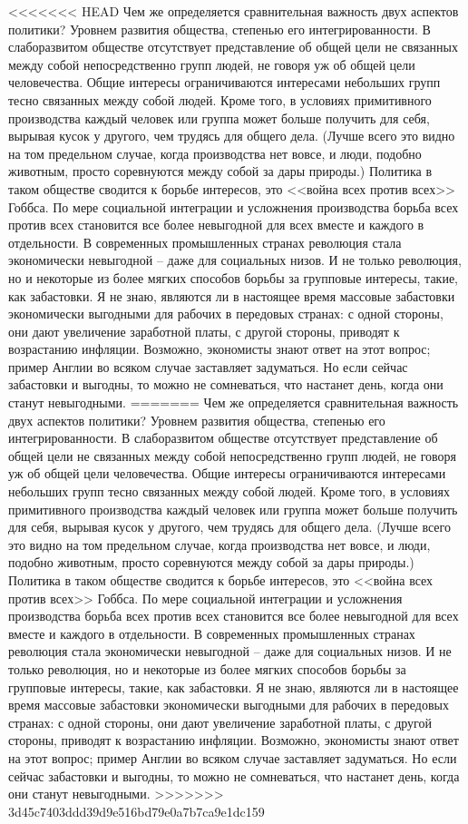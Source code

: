 \documentclass{book}
\begin{document}
<<<<<<< HEAD
Чем же определяется сравнительная важность двух аспектов политики? Уровнем развития общества, степенью его интегрированности. В слаборазвитом обществе отсутствует представ­ление об общей цели не связанных между собой непосредствен­но групп людей, не говоря уж об общей цели человечества. Общие интересы ограничиваются интересами небольших групп тесно связанных между собой людей. Кроме того, в условиях примитивного производства каждый человек или группа может больше получить для себя, вырывая кусок у другого, чем тру­дясь для общего дела. (Лучше всего это видно на том предель­ном случае, когда производства нет вовсе, и люди, подобно животным, просто соревнуются между собой за дары природы.) Политика в таком обществе сводится к борьбе интересов, это <<война всех против всех>> Гоббса. По мере социальной инте­грации и усложнения производства борьба всех против всех становится все более невыгодной для всех вместе и каждого в отдельности. В современных промышленных странах революция стала экономически невыгодной --  даже для со­циальных низов. И не только революция, но и некоторые из более мягких способов борьбы за групповые интересы, такие, как забастовки. Я не знаю, являются ли в настоящее время массовые забастовки экономически выгодными для рабочих в передовых странах: с одной стороны, они дают увеличение заработной платы, с другой стороны, приводят к возрастанию инфляции. Возможно, экономисты знают ответ на этот вопрос; пример Англии во всяком случае заставляет задуматься. Но если сейчас забастовки и выгодны, то можно не сомневаться, что настанет день, когда они станут невыгодными.
=======
Чем же определяется сравнительная важность двух аспектов политики? Уровнем развития общества, степенью его интегрированности. В слаборазвитом обществе отсутствует представ­ление об общей цели не связанных между собой непосредствен­но групп людей, не говоря уж об общей цели человечества. Общие интересы ограничиваются интересами небольших групп тесно связанных между собой людей. Кроме того, в условиях примитивного производства каждый человек или группа может больше получить для себя, вырывая кусок у другого, чем тру­дясь для общего дела. (Лучше всего это видно на том предель­ном случае, когда производства нет вовсе, и люди, подобно животным, просто соревнуются между собой за дары природы.) Политика в таком обществе сводится к борьбе интересов, это <<война всех против всех>> Гоббса. По мере социальной инте­грации и усложнения производства борьба всех против всех становится все более невыгодной для всех вместе и каждого в отдельности. В современных промышленных странах революция стала экономически невыгодной --  
даже для со­циальных низов. И не только революция, но и некоторые из более мягких способов борьбы за групповые интересы, такие, как забастовки. Я не знаю, являются ли в настоящее время массовые забастовки экономически выгодными для рабочих в передовых странах: с одной стороны, они дают увеличение заработной платы, с другой стороны, приводят к возрастанию инфляции. Возможно, экономисты знают ответ на этот вопрос; пример Англии во всяком случае заставляет задуматься. Но если сейчас забастовки и выгодны, то можно не сомневаться, что настанет день, когда они станут невыгодными.
>>>>>>> 3d45c7403ddd39d9e516bd79e0a7b7ca9e1dc159
\end{document}
